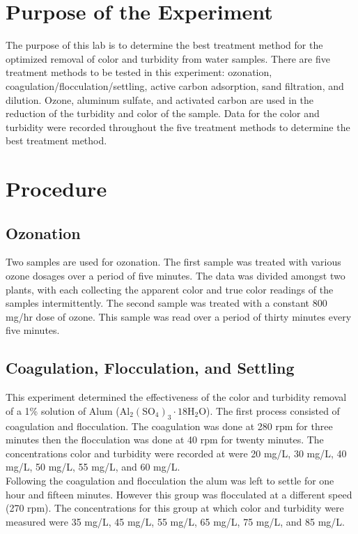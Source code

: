 \documentclass{article}
\begin{document}
    
    \tableofcontents
    \newpage
    \listoftables
    \listoffigures
    \newpage
    \section{Purpose of the Experiment}
    \indent The purpose of this lab is to determine the best treatment method for the optimized removal of color and turbidity from water samples. There are five treatment methods to be tested in this experiment: ozonation, coagulation/flocculation/settling, active carbon adsorption, sand filtration, and dilution. Ozone, aluminum sulfate, and activated carbon are used in the reduction of the turbidity and color of the sample. Data for the color and turbidity were recorded throughout the five treatment methods to determine the best treatment method. 
    \newpage
    \section{Procedure}
    \subsection{Ozonation}
    \indent Two samples are used for ozonation. The first sample was treated with various ozone dosages over a period of five minutes. The data was divided amongst two plants, with each collecting the apparent color and true color readings of the samples intermittently. The second sample was treated with a constant 800 mg/hr dose of ozone. This sample was read over a period of thirty minutes every five minutes. 
    \subsection{Coagulation, Flocculation, and Settling}
    \indent This experiment determined the effectiveness of the color and turbidity removal of a 1\% solution of Alum (\(\text{Al}_2(\text{SO}_4)_3\cdot 18\text{H}_2\text{O}\)). The first process consisted of coagulation and flocculation. The coagulation was done at 280 rpm for three minutes then the flocculation was done at 40 rpm for twenty minutes. The concentrations color and turbidity were recorded at were 20 mg/L, 30 mg/L, 40 mg/L, 50 mg/L, 55 mg/L, and 60 mg/L. \\
    \indent Following the coagulation and flocculation the alum was left to settle for one hour and fifteen minutes. However this group was flocculated at a different speed (270 rpm). The concentrations for this group at which color and turbidity were measured were 35 mg/L, 45 mg/L, 55 mg/L, 65 mg/L, 75 mg/L, and 85 mg/L.
\end{document}
